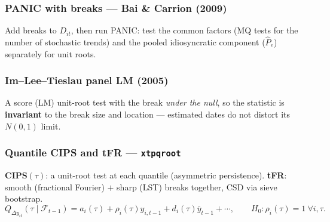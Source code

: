 \documentclass[11pt,a4paper]{article}
\newcommand{\cmd}[1]{\texttt{\textcolor{camber}{#1}}}
\newcommand{\hlt}[2]{\textcolor{#1}{\textbf{#2}}}
\theoremstyle{definition}
\begin{document}
\subsubsection{PANIC with breaks --- Bai \& Carrion (2009)}
Add breaks to $D_{it}$, then run PANIC: test the common factors (MQ tests for the number of stochastic
trends) and the pooled idiosyncratic component ($\hat P_e$) separately for unit roots.

\subsubsection{Im--Lee--Tieslau panel LM (2005)}
A score (LM) unit-root test with the break \emph{under the null}, so the statistic is
\hlt{cblue}{invariant} to the break size and location --- estimated dates do not distort its
$N(0,1)$ limit.

\subsubsection{Quantile CIPS and tFR --- \cmd{xtpqroot}}
\hlt{cpink}{CIPS$(\tau)$}: a unit-root test at each quantile (asymmetric persistence).
\hlt{cgrape}{tFR}: smooth (fractional Fourier) $+$ sharp (LST) breaks together, CSD via sieve
bootstrap.
\[
Q_{\Delta y_{it}}(\tau\mid\mathcal F_{t-1})=a_i(\tau)+\rho_i(\tau)y_{i,t-1}+d_i(\tau)\bar y_{t-1}+\cdots,
\qquad H_0:\rho_i(\tau)=1\ \forall i,\tau.
\]
\end{document}
